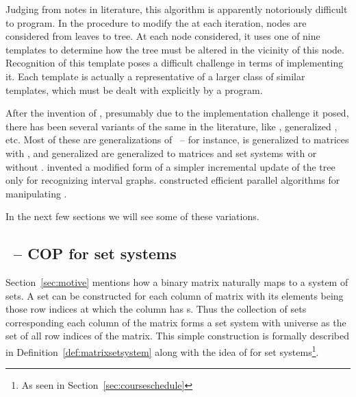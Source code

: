Judging from notes in literature, this algorithm is apparently
notoriously difficult to program. In the procedure to modify the
\PQtree at each iteration, nodes are considered from leaves to
tree. At each node considered, it uses one of nine templates to
determine how the tree must be altered in the vicinity of this
node. Recognition of this template poses a difficult challenge in
terms of implementing it. Each template is actually a representative
of a larger class of similar templates, which must be dealt with
explicitly by a program\cite{mcc04}.


After the invention of \PQtrees, presumably due to the implementation
challenge it posed, there has been several variants of the same in the
literature, like \PCtree \cite{sh99,wlh01,hm03}, generalized \PQtree
\cite{km89,mcc04}, \PQRtree \cite{mm96,mpt98} etc. Most of these are
generalizations of \PQtree\ -- for instance, \PCtree is generalized to
matrices with \CROP, \PQRtree and generalized \PQtree are generalized
to matrices and set systems with or without \COP. \cite{km89} invented
a modified form of \PQtree a simpler incremental update of the tree
only for recognizing interval graphs.  \cite{kr88} constructed
efficient parallel algorithms for manipulating \PQtrees. 

In the next few sections we will see some of these
variations.




\subsection{\PQRtree\ --  COP for set systems}
\label{sec:surveycertalgo}

Section~\ref{sec:motive} mentions how a binary matrix naturally maps
to a system of sets.  A set can be constructed for each column of
matrix with its elements being those row indices at which the column
has \un s. Thus the collection of sets corresponding each column of
the matrix forms a set system with universe as the set of all row
indices of the matrix.  This simple construction is formally described
in Definition~\ref{def:matrixsetsystem} along with the idea of \cop
for set systems\footnote{As seen in Section~\ref{sec:courseschedule}}.

